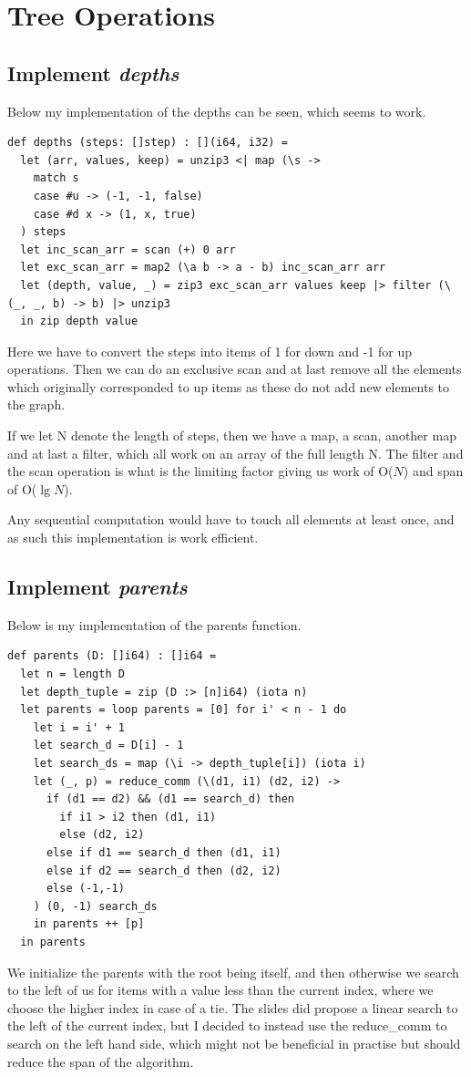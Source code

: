 \section{Tree Operations}

\subsection{Implement \emph{depths}}
Below my implementation of the depths can be seen, which seems to work.
\begin{lstlisting}[language={futhark}]
def depths (steps: []step) : [](i64, i32) =
  let (arr, values, keep) = unzip3 <| map (\s -> 
    match s
    case #u -> (-1, -1, false)
    case #d x -> (1, x, true)
  ) steps
  let inc_scan_arr = scan (+) 0 arr
  let exc_scan_arr = map2 (\a b -> a - b) inc_scan_arr arr
  let (depth, value, _) = zip3 exc_scan_arr values keep |> filter (\(_, _, b) -> b) |> unzip3
  in zip depth value
\end{lstlisting}

Here we have to convert the steps into items of 1 for down and -1 for up
operations. Then we can do an exclusive scan and at last remove all the
elements which originally corresponded to up items as these do not add new
elements to the graph.

If we let N denote the length of steps, then we have a map, a scan, another map
and at last a filter, which all work on an array of the full length N. The
filter and the scan operation is what is the limiting factor giving us work of
O($N$) and span of O($\lg N$).

Any sequential computation would have to touch all elements at least once, and
as such this implementation is work efficient.

\subsection{Implement \emph{parents}}
Below is my implementation of the parents function.
\begin{lstlisting}[language={futhark}]
def parents (D: []i64) : []i64 =
  let n = length D
  let depth_tuple = zip (D :> [n]i64) (iota n)
  let parents = loop parents = [0] for i' < n - 1 do 
    let i = i' + 1
    let search_d = D[i] - 1
    let search_ds = map (\i -> depth_tuple[i]) (iota i)
    let (_, p) = reduce_comm (\(d1, i1) (d2, i2) -> 
      if (d1 == d2) && (d1 == search_d) then 
        if i1 > i2 then (d1, i1)
        else (d2, i2)
      else if d1 == search_d then (d1, i1)
      else if d2 == search_d then (d2, i2)
      else (-1,-1)
    ) (0, -1) search_ds
    in parents ++ [p]
  in parents
\end{lstlisting}
We initialize the parents with the root being itself, and then otherwise we
search to the left of us for items with a value less than the current index,
where we choose the higher index in case of a tie. The slides did propose a
linear search to the left of the current index, but I decided to instead use
the reduce\_comm to search on the left hand side, which might not be beneficial
in practise but should reduce the span of the algorithm.

